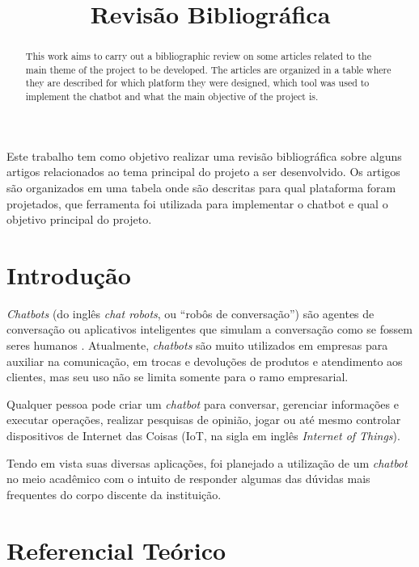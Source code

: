 \documentclass[12pt]{article}
\title{Revisão Bibliográfica}
\begin{document}
 

\maketitle

\begin{abstract}
This work aims to carry out a bibliographic review on some articles related to the main theme of the project to be developed. The articles are organized in a table where they are described for which platform they were designed, which tool was used to implement the chatbot and what the main objective of the project is.
\end{abstract}
     
\begin{resumo} 
Este trabalho tem como objetivo realizar uma revisão bibliográfica sobre alguns artigos relacionados ao tema principal do projeto a ser desenvolvido. Os artigos são organizados em uma tabela onde são descritas para qual plataforma foram projetados, que ferramenta foi utilizada para implementar o chatbot e qual o objetivo principal do projeto.
\end{resumo}


\section{Introdução}

{\itshape Chatbots} (do inglês {\itshape chat robots}, ou “robôs de conversação”) são agentes de conversação ou aplicativos inteligentes que simulam a conversação como se fossem seres humanos \cite{lucchesi:18}. Atualmente, {\itshape chatbots} são muito utilizados em empresas para auxiliar na comunicação, em trocas e devoluções de produtos e atendimento aos clientes, mas seu uso não se limita somente para o ramo empresarial.

Qualquer pessoa pode criar um {\itshape chatbot} para conversar, gerenciar informações e executar operações, realizar pesquisas de opinião, jogar ou até mesmo controlar dispositivos de Internet das Coisas (IoT, na sigla em inglês {\itshape Internet of Things}).

Tendo em vista suas diversas aplicações, foi planejado a utilização de um {\itshape chatbot} no meio acadêmico com o intuito de responder algumas das dúvidas mais frequentes do corpo discente da instituição.

\section{ Referencial Teórico}
\end{document}
